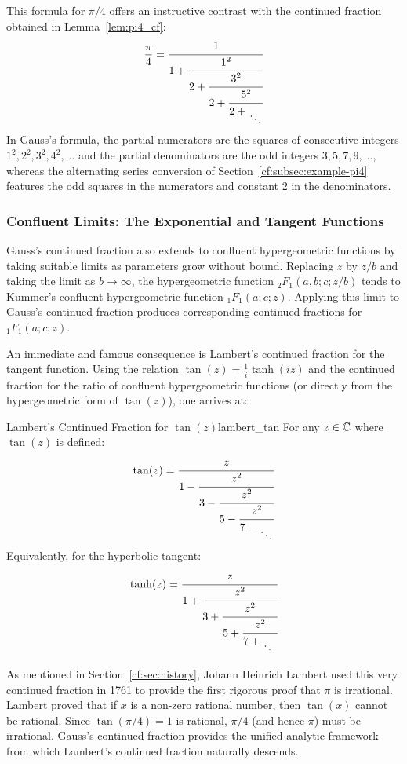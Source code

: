 \documentclass[a4paper]{article}
\begin{document}
\begin{remark}
  This formula for $\pi/4$ offers an instructive contrast with the continued fraction obtained in Lemma~\ref{lem:pi4_cf}:
  \[
    \frac{\pi}{4} = \cfrac{1}{1+\cfrac{1^2}{2 +\cfrac{3^2}{2 + \cfrac{5^2}{2 + \CFDots}}}}
  \]
  In Gauss's formula, the partial numerators are the squares of consecutive integers $1^2, 2^2, 3^2, 4^2, \dots$ and the partial denominators are the odd integers $3, 5, 7, 9, \dots$, whereas the alternating series conversion of Section~\ref{cf:subsec:example-pi4} features the odd squares in the numerators and constant $2$ in the denominators.
\end{remark}

\subsubsection{Confluent Limits: The Exponential and Tangent Functions}
Gauss's continued fraction also extends to confluent hypergeometric functions by taking suitable limits as parameters grow without bound.
Replacing $z$ by $z/b$ and taking the limit as $b \to \infty$, the hypergeometric function ${_2F_1}(a, b; c; z/b)$ tends to Kummer's confluent hypergeometric function ${_1F_1}(a; c; z)$.
Applying this limit to Gauss's continued fraction produces corresponding continued fractions for ${_1F_1}(a; c; z)$.

An immediate and famous consequence is Lambert's continued fraction for the tangent function.
Using the relation $\tan(z) = \frac{1}{i} \tanh(i z)$ and the continued fraction for the ratio of confluent hypergeometric functions (or directly from the hypergeometric form of $\tan(z)$), one arrives at:

\begin{mylemma}{Lambert's Continued Fraction for \texorpdfstring{$\tan(z)$}{tan(z)}}{lambert_tan}
  For any $z \in \mathbb{C}$ where $\tan(z)$ is defined:
  \[
    \tan(z) = \cfrac{z}{1 - \cfrac{z^2}{3 - \cfrac{z^2}{5 - \cfrac{z^2}{7 - \CFDots}}}}
  \]
  Equivalently, for the hyperbolic tangent:
  \[
    \tanh(z) = \cfrac{z}{1 + \cfrac{z^2}{3 + \cfrac{z^2}{5 + \cfrac{z^2}{7 + \CFDots}}}}
  \]
\end{mylemma}

\begin{remark}
  As mentioned in Section~\ref{cf:sec:history}, Johann Heinrich Lambert used this very continued fraction in 1761 to provide the first rigorous proof that $\pi$ is irrational.
  Lambert proved that if $x$ is a non-zero rational number, then $\tan(x)$ cannot be rational.
  Since $\tan(\pi/4) = 1$ is rational, $\pi/4$ (and hence $\pi$) must be irrational.
  Gauss's continued fraction provides the unified analytic framework from which Lambert's continued fraction naturally descends.
\end{remark}
\end{document}
